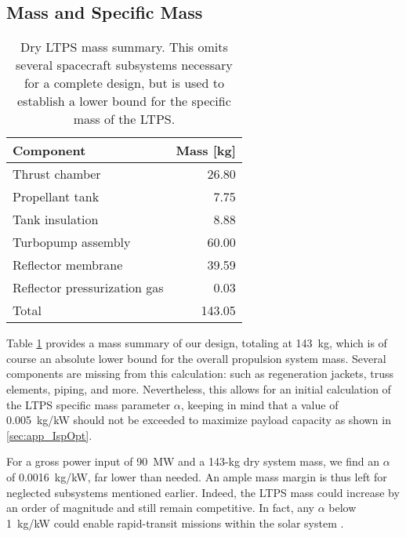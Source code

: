 \documentclass[final,3p,times,twocolumn,sort&compress, lefttitle]{elsarticle}
\begin{document}
        \subsection{Mass and Specific Mass}
            \begin{table}[b]
                \centering
                \caption{Dry LTPS mass summary. This omits several spacecraft subsystems necessary for a complete design, but is used to establish a lower bound for the specific mass of the LTPS.}
                \label{tab:masses}
                \begin{tabular}{@{}lr@{}}
                    \toprule
                    Component                    & Mass {[}kg{]} \\ \midrule
                    Thrust chamber               & 26.80         \\
                    Propellant tank              & 7.75          \\
                    Tank insulation              & 8.88          \\
                    Turbopump assembly           & 60.00         \\
                    Reflector membrane           & 39.59         \\
                    Reflector pressurization gas & 0.03          \\ \midrule
                    Total                        & 143.05        \\ \bottomrule   
                \end{tabular}
            \end{table}
            Table \ref{tab:masses} provides a mass summary of our design, totaling at 143~kg, which is of course an absolute lower bound for the overall propulsion system mass. Several components are missing from this calculation: such as regeneration jackets, truss elements, piping, and more. Nevertheless, this allows for an initial calculation of the LTPS specific mass parameter $\alpha$, keeping in mind that a value of 0.005~kg/kW should not be exceeded to maximize payload capacity as shown in \ref{sec:app_IspOpt}.
    
            For a gross power input of 90~MW and a 143-kg dry system mass, we find an $\alpha$ of 0.0016~kg/kW, far lower than needed. An ample mass margin is thus left for neglected subsystems mentioned earlier. Indeed, the LTPS mass could increase by an order of magnitude and still remain competitive. In fact, any $\alpha$ below 1~kg/kW could enable rapid-transit missions within the solar system \cite{pelaccio_examination_2002}.
            
\end{document}
